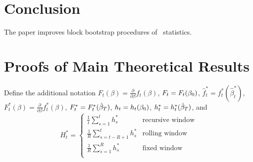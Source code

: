 \documentclass[12pt,fleqn]{article}
\begin{document}
\section{Conclusion}\label{sec:4}
The paper improves block bootstrap procedures of \oos\
statistics.

\appendix
\section{Proofs of Main Theoretical Results}\label{sec:B}

Define the additional notation
$F_t(\beta) = \tfrac{\partial}{\partial \beta} f_t(\beta)$,
$F_t = F_t(\btrue)$,
$\hat f_t^* = f_t^*(\hat\beta_t^*)$,
$F_t^*(\beta) = \tfrac{\partial}{\partial \beta} f_t^*(\beta)$,
$F_t^* = F_t^*(\btrue[*])$,
$h_t = h_t(\btrue)$,
$h_t^* = h_t^*(\btrue[*])$,
and
\begin{equation*}
      H_{t}^* = \begin{cases}
        \tfrac1t \sum_{s=1}^t h_{s}^* & \text{recursive window} \\
        \tfrac1R \sum_{s=t-R+1}^t h_{s}^* & \text{rolling window} \\
        \tfrac1R \sum_{s=1}^R h_{s}^* & \text{fixed window} \\
      \end{cases}
\end{equation*}
\end{document}
